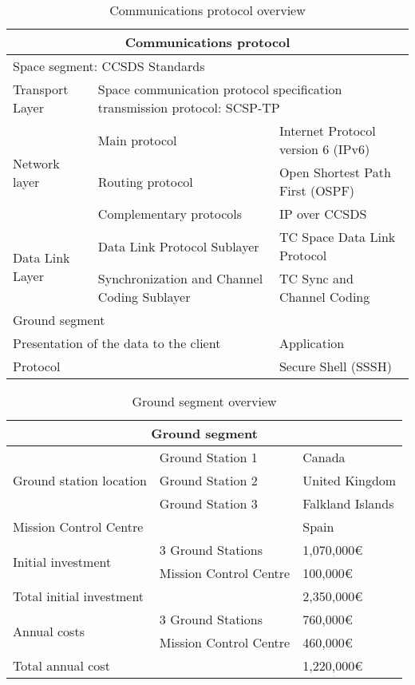 \documentclass[12pt,a4paper]{report}
\author{Eva María Urbano González}
\begin{document}
\begin{table}
\begin{center}
\begin{tabular}{|l|l|l|}
\hline
\multicolumn{3}{|c|}{\textbf{Communications protocol}}\\
\hline
\multicolumn{3}{|l|}{Space segment: CCSDS Standards}\\
\hline
Transport Layer&\multicolumn{2}{|l|}{Space communication protocol specification transmission protocol: SCSP-TP}\\
\hline
\multirow{3}{*}{Network layer}&Main protocol&Internet Protocol version 6 (IPv6)\\
&Routing protocol&Open Shortest Path First (OSPF)\\
&Complementary protocols&IP over CCSDS\\
\hline
\multirow{2}{*}{Data Link Layer}&Data Link Protocol Sublayer&TC Space Data Link Protocol\\
&Synchronization and Channel Coding Sublayer&TC Sync and Channel Coding\\
\hline
\multicolumn{3}{|l|}{Ground segment}\\
\hline
\multicolumn{2}{|l|}{Presentation of the data to the client}&Application\\
\hline
\multicolumn{2}{|l|}{Protocol}&Secure Shell (SSSH)\\
\hline
\end{tabular}
\caption{Communications protocol overview}
\end{center}
\end{table}

\begin{table}
\begin{center}
\begin{tabular}{|l|l|l|}
\hline
\multicolumn{3}{|c|}{\textbf{Ground segment}}\\
\hline
\multirow{3}{*}{Ground station location}&Ground Station 1&Canada\\
&Ground Station 2&United Kingdom\\
&Ground Station 3&Falkland Islands\\
\hline
\multicolumn{2}{|l|}{Mission Control Centre}&Spain\\
\hline
\multirow{2}{*}{Initial investment}&3 Ground Stations&1,070,000\euro \\
&Mission Control Centre&100,000\euro \\
\hline
\multicolumn{2}{|l|}{Total initial investment}&2,350,000\euro \\
\hline
\multirow{2}{*}{Annual costs}&3 Ground Stations&760,000\euro \\
&Mission Control Centre&460,000\euro \\
\hline
\multicolumn{2}{|l|}{Total annual cost}&1,220,000\euro \\
\hline
\end{tabular}
\caption{Ground segment overview}
\end{center}
\end{table}
\end{document}
